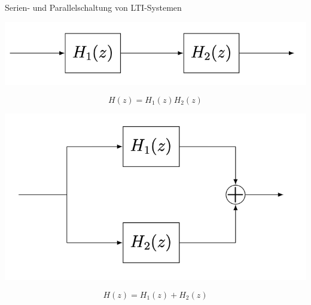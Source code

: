 \documentclass[14pt, aspectratio=169, handout]{beamer}
\begin{document}
\begin{frame}{Serien- und Parallelschaltung von LTI-Systemen}
    \begin{minipage}[t]{0.45\textwidth}
            \includegraphics[width=\linewidth]{figures/Serienschaltung.png}
            \end{minipage}
            \hfill
            \begin{minipage}[c]{0.45\textwidth}
            $$H(z) = H_1(z)H_2(z)$$
            \vspace*{0.77cm}
            \end{minipage}

            \begin{minipage}[t]{0.45\textwidth}
            \includegraphics[width=\linewidth]{figures/Parallelschaltung.png}
            \end{minipage}
            \hfill
            \begin{minipage}[c]{0.45\textwidth}
            $$H(z) = H_1(z) + H_2(z)$$
            \vspace*{3.45cm}
            \end{minipage}
            \vspace*{-3.5cm}
\end{frame}
\end{document}
